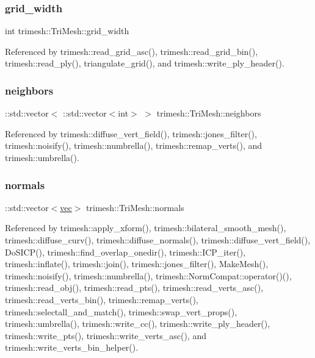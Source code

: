 \subsubsection{\texorpdfstring{grid\+\_\+width}{grid\_width}}
{\footnotesize\ttfamily int trimesh\+::\+Tri\+Mesh\+::grid\+\_\+width}



Referenced by trimesh\+::read\+\_\+grid\+\_\+asc(), trimesh\+::read\+\_\+grid\+\_\+bin(), trimesh\+::read\+\_\+ply(), triangulate\+\_\+grid(), and trimesh\+::write\+\_\+ply\+\_\+header().

\mbox{\label{classtrimesh_1_1TriMesh_a083998f6cb007ea8a98a51a32732c894}} 
\subsubsection{\texorpdfstring{neighbors}{neighbors}}
{\footnotesize\ttfamily \+::std\+::vector$<$ \+::std\+::vector$<$int$>$ $>$ trimesh\+::\+Tri\+Mesh\+::neighbors}



Referenced by trimesh\+::diffuse\+\_\+vert\+\_\+field(), trimesh\+::jones\+\_\+filter(), trimesh\+::noisify(), trimesh\+::numbrella(), trimesh\+::remap\+\_\+verts(), and trimesh\+::umbrella().

\mbox{\label{classtrimesh_1_1TriMesh_a5ec6eef6589393e7d445f77bcb33ee74}} 
\subsubsection{\texorpdfstring{normals}{normals}}
{\footnotesize\ttfamily \+::std\+::vector$<$\hyperlink{namespacetrimesh_a4fc2b83feba99c931f837a0c7d4b4df1}{vec}$>$ trimesh\+::\+Tri\+Mesh\+::normals}



Referenced by trimesh\+::apply\+\_\+xform(), trimesh\+::bilateral\+\_\+smooth\+\_\+mesh(), trimesh\+::diffuse\+\_\+curv(), trimesh\+::diffuse\+\_\+normals(), trimesh\+::diffuse\+\_\+vert\+\_\+field(), Do\+S\+I\+C\+P(), trimesh\+::find\+\_\+overlap\+\_\+onedir(), trimesh\+::\+I\+C\+P\+\_\+iter(), trimesh\+::inflate(), trimesh\+::join(), trimesh\+::jones\+\_\+filter(), Make\+Mesh(), trimesh\+::noisify(), trimesh\+::numbrella(), trimesh\+::\+Norm\+Compat\+::operator()(), trimesh\+::read\+\_\+obj(), trimesh\+::read\+\_\+pts(), trimesh\+::read\+\_\+verts\+\_\+asc(), trimesh\+::read\+\_\+verts\+\_\+bin(), trimesh\+::remap\+\_\+verts(), trimesh\+::selectall\+\_\+and\+\_\+match(), trimesh\+::swap\+\_\+vert\+\_\+props(), trimesh\+::umbrella(), trimesh\+::write\+\_\+cc(), trimesh\+::write\+\_\+ply\+\_\+header(), trimesh\+::write\+\_\+pts(), trimesh\+::write\+\_\+verts\+\_\+asc(), and trimesh\+::write\+\_\+verts\+\_\+bin\+\_\+helper().

